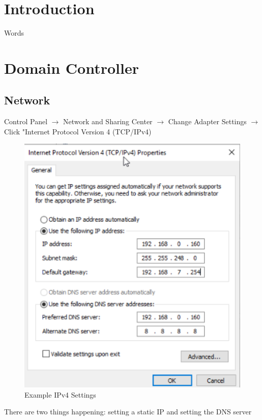 \documentclass{article}
\begin{document}
\graphicspath{ {./Images/} }
\tableofcontents

\section{Introduction}
Words

\section{Domain Controller}

\subsection{Network}
Control Panel $\rightarrow$ Network and Sharing Center $\rightarrow$
Change Adapter Settings $\rightarrow$ Click "Internet Protocol Version 4 (TCP/IPv4)

\begin{figure}[]
        \centering
        \includegraphics[width=1\textwidth]{SampleDCIPv4.png}
        \caption{Example IPv4 Settings}
        \label{fig:IPv4Settings}
\end{figure}

There are two things happening: setting a static IP and setting the DNS server
\end{document}
